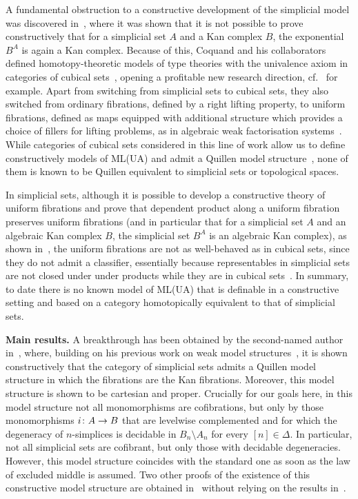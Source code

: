 \documentclass[reqno,10pt,a4paper,oneside,draft]{amsart}
\begin{document}
 

A fundamental obstruction to a constructive development of  the simplicial model was discovered in~\cite{coquand-non-constructivity-kan}, where it was shown that
it is not possible to prove constructively that for a simplicial set $A$ and a
Kan complex $B$, the exponential~$B^A$ is again a Kan complex.
Because of this, Coquand and his collaborators  defined homotopy-theoretic models of type
theories with the univalence axiom in categories of cubical sets~\cite{coquand-cubical-sets}, opening a profitable new research direction, cf.~\cite{awodey-cubical,cohen-et-al:cubicaltt,PittsAM:aximct} for example. Apart from switching 
from simplicial sets to cubical sets, they also switched from ordinary fibrations, defined by a right lifting property,
to uniform fibrations, defined as maps equipped with additional structure which 
 provides a choice of fillers for lifting problems, as in algebraic weak factorisation systems~\cite{garner:small-object-argument,grandis-tholen-nwfs}. While 
categories of cubical sets considered in this line of work allow us to define constructively models of 
ML(UA) and admit a Quillen
model structure~\cite{SattlerC:equepu}, none of them
 is known to be Quillen equivalent to simplicial sets or topological spaces.

In simplicial sets, although it is possible to develop  a constructive theory of uniform fibrations and prove that dependent product along a uniform fibration preserves
uniform fibrations (and in particular that for a simplicial set $A$ and an 
 algebraic Kan complex $B$, the simplicial set $B^A$ is an algebraic Kan complex),
  as shown in~\cite{gambino2017frobenius}, the uniform fibrations
are not as well-behaved as in cubical sets,
since they do not admit a classifier, essentially because 
representables  in simplicial sets are not closed under under products while they are in cubical sets~\cite{SattlerC:faiaut}. 
In summary, to date there is no known model of ML(UA) that is definable in a constructive setting and
based on a category homotopically equivalent to that of simplicial sets. 

\smallskip

\noindent
\textbf{Main results.}
A breakthrough has been obtained  by the second-named author in~\cite{henry2019qms}, where, building on his previous work on weak model structures~\cite{henry2018wms},
it is shown constructively that the category of simplicial sets admits a Quillen model structure in which the
fibrations are the Kan fibrations. Moreover, this model structure is shown to be cartesian and proper.  Crucially for our goals here,  in this model structure not all monomorphisms are 
cofibrations, but only by those monomorphisms $i \colon A \to B$ that are levelwise complemented 
and for which the degeneracy of $n$-simplices is decidable in $B_n \setminus A_n$ for every $[n] \in \Delta$. In particular, not all simplicial sets are cofibrant, but only those with decidable degeneracies. However, this model structure coincides with
the standard one as soon as the law of excluded middle is assumed. Two other  
proofs of the  existence of this constructive
model structure are obtained in~\cite{GambinoN:anocp} without relying on the results in~\cite{henry2018wms}. 
\end{document}
